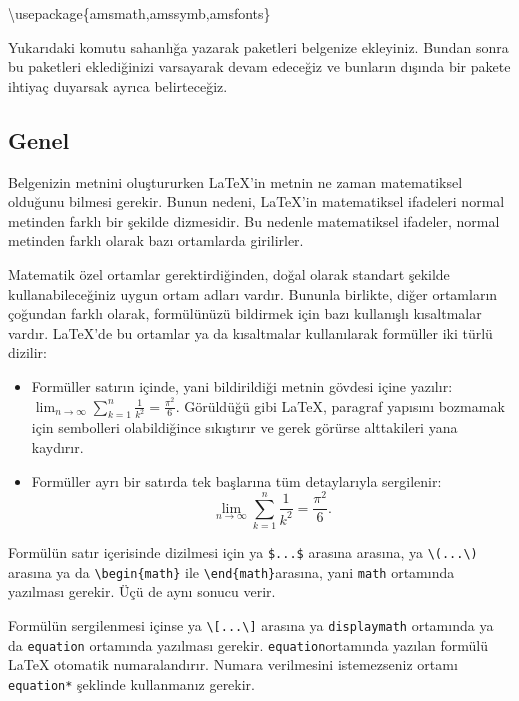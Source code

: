 \documentclass[
  10pt,
]{scrbook}
\newenvironment{Shaded}{}{}
\newcommand{\BuiltInTok}[1]{#1}
\newcommand{\ExtensionTok}[1]{#1}
\newcommand{\NormalTok}[1]{#1}
\providecommand{\tightlist}{%
  \setlength{\itemsep}{0pt}\setlength{\parskip}{0pt}}
\theoremstyle{definition}
\theoremstyle{definition}
\theoremstyle{definition}
\theoremstyle{definition}
\theoremstyle{remark}
\begin{document}
\begin{Shaded}
\begin{Highlighting}[]
\BuiltInTok{\textbackslash{}usepackage}\NormalTok{\{}\ExtensionTok{amsmath,amssymb,amsfonts}\NormalTok{\}}
\end{Highlighting}
\end{Shaded}

Yukarıdaki komutu sahanlığa yazarak paketleri belgenize ekleyiniz. Bundan sonra bu paketleri eklediğinizi varsayarak devam edeceğiz ve bunların dışında bir pakete ihtiyaç duyarsak ayrıca belirteceğiz.

\hypertarget{genel-1}{%
\subsection{Genel}\label{genel-1}}

Belgenizin metnini oluştururken LaTeX'in metnin ne zaman matematiksel olduğunu bilmesi gerekir. Bunun nedeni, LaTeX'in matematiksel ifadeleri normal metinden farklı bir şekilde dizmesidir. Bu nedenle matematiksel ifadeler, normal metinden farklı olarak bazı ortamlarda girilirler.

Matematik özel ortamlar gerektirdiğinden, doğal olarak standart şekilde kullanabileceğiniz uygun ortam adları vardır. Bununla birlikte, diğer ortamların çoğundan farklı olarak, formülünüzü bildirmek için bazı kullanışlı kısaltmalar vardır. LaTeX'de bu ortamlar ya da kısaltmalar kullanılarak formüller iki türlü dizilir:

\begin{itemize}
\tightlist
\item
  Formüller satırın içinde, yani bildirildiği metnin gövdesi içine yazılır: \(\lim_{n \to \infty} \sum_{k=1}^n \frac{1}{k^2} =\frac{\pi^2}{6}\). Görüldüğü gibi LaTeX, paragraf yapısını bozmamak için sembolleri olabildiğince sıkıştırır ve gerek görürse alttakileri yana kaydırır.
\item
  Formüller ayrı bir satırda tek başlarına tüm detaylarıyla sergilenir: \[\lim_{n \to \infty} \sum_{k=1}^n
  \frac{1}{k^2} =\frac{\pi^2}{6}.\]
\end{itemize}

Formülün satır içerisinde dizilmesi için ya \texttt{\$...\$} arasına arasına, ya \texttt{\textbackslash{}(...\textbackslash{})} arasına ya da \texttt{\textbackslash{}begin\{math\}} ile \texttt{\textbackslash{}end\{math\}}arasına, yani \texttt{math} ortamında yazılması gerekir. Üçü de aynı sonucu verir.

Formülün sergilenmesi içinse ya \texttt{\textbackslash{}{[}...\textbackslash{}{]}} arasına ya \texttt{displaymath} ortamında ya da \texttt{equation} ortamında yazılması gerekir. \texttt{equation}ortamında yazılan formülü LaTeX otomatik numaralandırır. Numara verilmesini istemezseniz ortamı \texttt{equation*} şeklinde kullanmanız gerekir.
\end{document}
